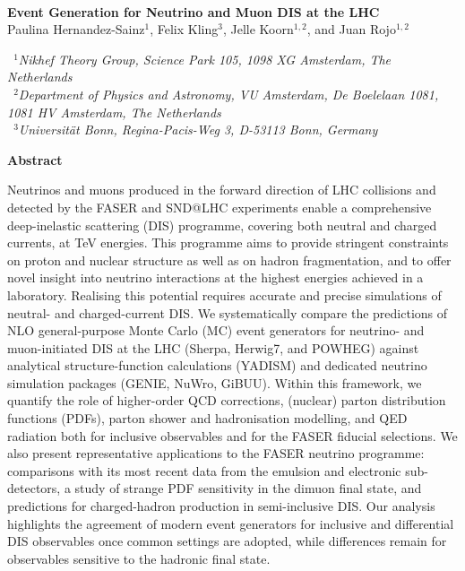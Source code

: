 \documentclass[11pt,a4paper]{article}
\numberwithin{equation}{section}
\numberwithin{figure}{section}
\numberwithin{table}{section}
\newcommand{\sherpa}{{\sc\small Sherpa}\xspace}
\newcommand{\herwig}{{\sc\small Herwig7}\xspace}
\newcommand{\powheg}{{\sc\small POWHEG}\xspace}
\newcommand{\genie}{{\sc\small GENIE}\xspace}
\newcommand{\yadism}{{\sc\small YADISM}\xspace}
\begin{document}

$\qquad$
\vspace{1.6cm}

\begin{center}
  {\Large \bf Event Generation for Neutrino and Muon DIS at the LHC}\\
  \vspace{1.1cm}
  {\small
  Paulina Hernandez-Sainz$^{1}$, Felix Kling$^{3}$, Jelle Koorn$^{1,2}$, and Juan Rojo$^{1,2}$
  }\\

\vspace{0.7cm}

{\it \small
  ~$^{1}$Nikhef Theory Group, Science Park 105, 1098 XG Amsterdam, The Netherlands\\[0.1cm]
  ~$^{2}$Department of Physics and Astronomy, VU Amsterdam, De Boelelaan 1081, \\[0.1cm] 1081 HV Amsterdam, The Netherlands\\[0.1cm]
  ~$^{3}$Universit\"at Bonn, Regina-Pacis-Weg 3, D-53113 Bonn, Germany\\[0.1cm]
 }

\vspace{1.0cm}

{\bf \large Abstract}

\end{center}

Neutrinos and muons produced in the forward direction of LHC collisions and detected by the FASER and SND@LHC experiments enable a comprehensive
deep-inelastic scattering (DIS) programme, covering both neutral and charged currents, at TeV energies.
%
This programme aims to provide stringent constraints on proton and nuclear structure as well as on hadron fragmentation, and to offer novel insight into neutrino interactions at the highest energies achieved in a laboratory.
%
Realising this potential
requires accurate and precise simulations of neutral- and charged-current DIS.
%
We systematically compare the predictions of NLO general-purpose Monte Carlo (MC) event generators for neutrino- and muon-initiated DIS at the LHC (\sherpa, \herwig, and \powheg) against analytical structure-function calculations (\yadism) and dedicated neutrino simulation packages (\genie, {\sc\small NuWro}, {\sc\small GiBUU}).
%
Within this framework, we quantify the role of higher-order QCD corrections, (nuclear) parton distribution functions (PDFs), parton shower and hadronisation modelling, and QED radiation both for inclusive observables and for the FASER fiducial selections.
%
We also present representative applications to the FASER neutrino programme: comparisons with its most recent data from the emulsion and electronic sub-detectors, a study of strange PDF sensitivity in the dimuon final state, and predictions for charged-hadron production in semi-inclusive DIS.
%
Our analysis highlights the agreement of modern event generators for inclusive and differential DIS observables once common settings are adopted, while differences remain for observables sensitive to the hadronic final state.
\end{document}
